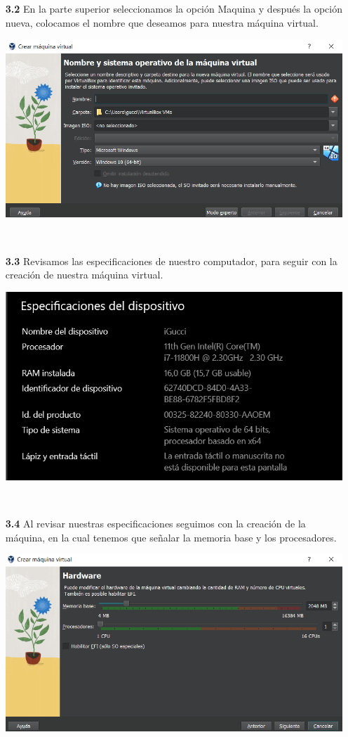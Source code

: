 \documentclass[11pt,twoside]{book}
\begin{document}
\begin{enumerate}
\begin{enumerate}
    \item[\textbf{3.2}] En la parte superior seleccionamos la opción Maquina y después la opción nueva, colocamos el nombre que deseamos para nuestra máquina virtual.
    
    \begin{minipage}{\linewidth}
        \centering
        \includegraphics[width=0.4\linewidth]{MVU.png}
        \label{fig:etiqueta}
    \end{minipage}\\

    \item[\textbf{3.3}] Revisamos las especificaciones de nuestro computador, para seguir con la creación de nuestra máquina virtual.

    \begin{minipage}{\linewidth}
        \centering
        \includegraphics[width=0.4\linewidth]{Especificaciones.png}
        \label{fig:etiqueta}
    \end{minipage}\\

    \item[\textbf{3.4}] Al revisar nuestras especificaciones seguimos con la creación de la máquina, en la cual tenemos que señalar la memoria base y los procesadores.

    \begin{minipage}{\linewidth}
        \centering
        \includegraphics[width=0.4\linewidth]{H.Wmv.png}
        \label{fig:etiqueta}
    \end{minipage}\\


\end{enumerate}
\end{enumerate}
\end{document}
